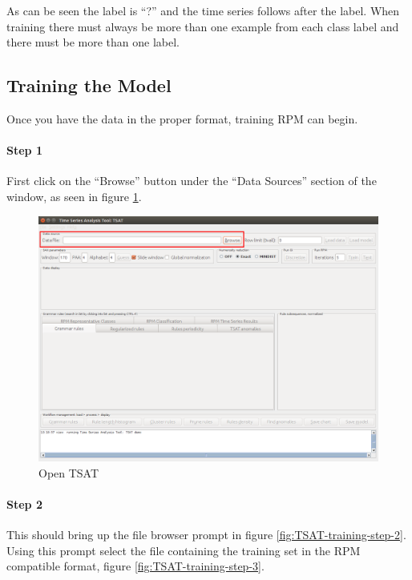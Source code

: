 \documentclass[titlepage, letterpaper, 12pt]{article}
\begin{document}
As can be seen the label is ``?'' and the time series follows after the label.  When training there must always be more than one example from each class label and there must be more than one label.

\subsection{Training the Model}
\label{RPMTrain}

Once you have the data in the proper format, training RPM can begin.

\paragraph{Step 1}
First click on the ``Browse'' button under the ``Data Sources'' section of the window, as seen in figure \ref{fig:TSAT-training-step-1}. 

\begin{figure}[h]
	\includegraphics[width=\textwidth]{TSAT-training-step-1}
	\caption{Open TSAT}
	\label{fig:TSAT-training-step-1}
\end{figure}
\newpage
\paragraph{Step 2}
This should bring up the file browser prompt in figure \ref{fig:TSAT-training-step-2}. Using this prompt select the file containing the training set in the RPM compatible format, figure \ref{fig:TSAT-training-step-3}.
\end{document}
